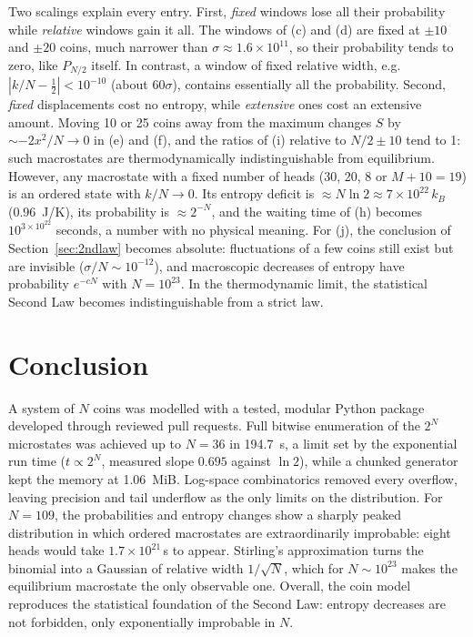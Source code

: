 \documentclass[11pt,a4paper]{article}
\begin{document}
Two scalings explain every entry. First, \emph{fixed} windows lose all their probability while
\emph{relative} windows gain it all. The windows of (c) and (d) are fixed at $\pm10$ and $\pm20$
coins, much narrower than $\sigma\approx1.6\times10^{11}$, so their probability tends to zero,
like $P_{N/2}$ itself. In contrast, a window of fixed relative width, e.g.\
$|k/N-\tfrac12|<10^{-10}$ (about $60\sigma$), contains essentially all the probability.
Second, \emph{fixed} displacements cost no entropy, while \emph{extensive} ones cost an
extensive amount. Moving 10 or 25 coins away from the maximum changes $S$ by $\sim-2x^2/N\to0$
in (e) and (f), and the ratios of (i) relative to $N/2\pm10$ tend to 1: such macrostates are
thermodynamically indistinguishable from equilibrium. However, any macrostate with a fixed number
of heads (30, 20, 8 or $M+10=19$) is an ordered state with $k/N\to0$. Its entropy deficit is
$\approx N\ln2\approx7\times10^{22}\,k_B$ (\SI{0.96}{J/K}), its probability is
$\approx2^{-N}$, and the waiting time of (h) becomes $10^{3\times10^{22}}$ seconds, a number
with no physical meaning. For (j), the conclusion of Section~\ref{sec:2ndlaw} becomes absolute:
fluctuations of a few coins still exist but are invisible ($\sigma/N\sim10^{-12}$), and
macroscopic decreases of entropy have probability $e^{-cN}$ with $N=10^{23}$. In the
thermodynamic limit, the statistical Second Law becomes indistinguishable from a strict law.

\section{Conclusion}
\label{sec:conclusion}
A system of $N$ coins was modelled with a tested, modular Python package developed through
reviewed pull requests. Full bitwise enumeration of the $2^N$ microstates was achieved up to
$N=36$ in \SI{194.7}{s}, a limit set by the exponential run time ($t\propto2^N$, measured slope
$0.695$ against $\ln2$), while a chunked generator kept the memory at \SI{1.06}{MiB}. Log-space
combinatorics removed every overflow, leaving precision and tail underflow as the only limits on
the distribution. For $N=109$, the probabilities and entropy changes show a sharply peaked
distribution in which ordered macrostates are extraordinarily improbable: eight heads would take
$1.7\times10^{21}\,$s to appear. Stirling's approximation turns the binomial into a Gaussian of
relative width $1/\sqrt N$, which for $N\sim10^{23}$ makes the equilibrium macrostate the only
observable one. Overall, the coin model reproduces the statistical foundation of the Second Law:
entropy decreases are not forbidden, only exponentially improbable in $N$.
\end{document}
